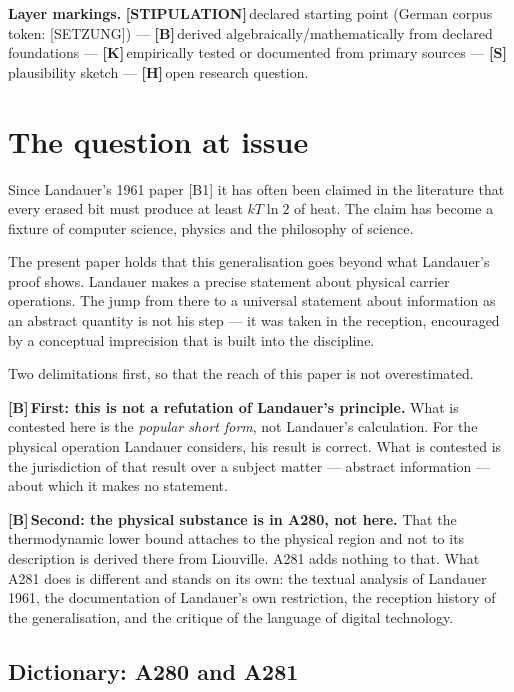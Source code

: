 \documentclass[11pt,a4paper]{article}
\newcommand{\LS}{\textcolor{laySet}{\textbf{\footnotesize\textsf{[STIPULATION]}}}\,}
\newcommand{\LK}{\textcolor{layK}{\textbf{\footnotesize\textsf{[K]}}}\,}
\newcommand{\LB}{\textcolor{layB}{\textbf{\footnotesize\textsf{[B]}}}\,}
\newcommand{\LSk}{\textcolor{layS}{\textbf{\footnotesize\textsf{[S]}}}\,}
\newcommand{\LH}{\textcolor{layH}{\textbf{\footnotesize\textsf{[H]}}}\,}
\theoremstyle{ffgft}
\begin{document}
\bigskip

\begingroup\small\noindent
\textbf{Layer markings.} \LS declared starting point (German corpus token:
[SETZUNG]) --- \LB derived algebraically/mathematically from declared foundations
--- \LK empirically tested or documented from primary sources --- \LSk
plausibility sketch --- \LH open research question.
\par\endgroup

\bigskip

\section{The question at issue}

Since Landauer's 1961 paper [B1] it has often been claimed in the literature that
every erased bit must produce at least $kT\ln 2$ of heat. The claim has become a
fixture of computer science, physics and the philosophy of science.

The present paper holds that this generalisation goes beyond what Landauer's proof
shows. Landauer makes a precise statement about physical carrier operations. The
jump from there to a universal statement about information as an abstract quantity
is not his step --- it was taken in the reception, encouraged by a conceptual
imprecision that is built into the discipline.

Two delimitations first, so that the reach of this paper is not overestimated.

\LB \textbf{First: this is not a refutation of Landauer's principle.} What is
contested here is the \emph{popular short form}, not Landauer's calculation. For
the physical operation Landauer considers, his result is correct. What is
contested is the jurisdiction of that result over a subject matter --- abstract
information --- about which it makes no statement.

\LB \textbf{Second: the physical substance is in A280, not here.} That the
thermodynamic lower bound attaches to the physical region and not to its
description is derived there from Liouville. A281 adds nothing to that. What A281
does is different and stands on its own: the textual analysis of Landauer 1961,
the documentation of Landauer's own restriction, the reception history of the
generalisation, and the critique of the language of digital technology.

\subsection{Dictionary: A280 and A281}
\label{sec:dictionary}
\end{document}
